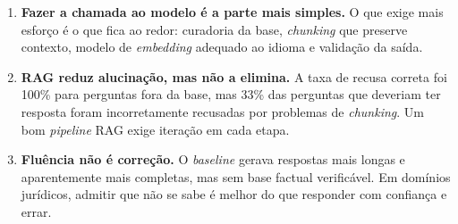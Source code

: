 \documentclass[
  12pt,
  a4paper,
  brazil,
  article,
  oneside,
  sumario=tradicional
]{abntex2}
\begin{document}
\begin{enumerate}[leftmargin=*]
  \item \textbf{Fazer a chamada ao modelo é a parte mais simples.} O que exige mais
        esforço é o que fica ao redor: curadoria da base, \textit{chunking} que
        preserve contexto, modelo de \textit{embedding} adequado ao idioma e validação
        da saída.

  \item \textbf{RAG reduz alucinação, mas não a elimina.} A taxa de recusa correta
        foi 100\% para perguntas fora da base, mas 33\% das perguntas que deveriam ter
        resposta foram incorretamente recusadas por problemas de \textit{chunking}. Um
        bom \textit{pipeline} RAG exige iteração em cada etapa.

  \item \textbf{Fluência não é correção.} O \textit{baseline} gerava respostas mais
        longas e aparentemente mais completas, mas sem base factual verificável. Em
        domínios jurídicos, admitir que não se sabe é melhor do que responder com
        confiança e errar.
\end{enumerate}
\end{document}
